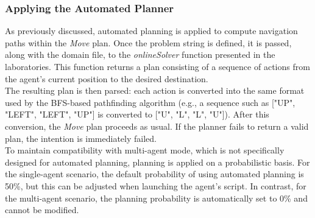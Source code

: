         \subsubsection{Applying the Automated Planner}
            As previously discussed, automated planning is applied to compute navigation paths within the \textit{Move} plan. Once the problem string is defined, it is passed, along with the domain file, to the \textit{onlineSolver} function presented in the laboratories. This function returns a plan consisting of a sequence of actions from the agent's current position to the desired destination.
            \medskip\\
            The resulting plan is then parsed: each action is converted into the same format used by the BFS-based pathfinding algorithm (e.g., a sequence such as ["UP", "LEFT", "LEFT", "UP"] is converted to ["U", "L", "L", "U"]). After this conversion, the \textit{Move} plan proceeds as usual. If the planner fails to return a valid plan, the intention is immediately failed.
            \medskip\\
            To maintain compatibility with multi-agent mode, which is not specifically designed for automated planning, planning is applied on a probabilistic basis. For the single-agent scenario, the default probability of using automated planning is 50\%, but this can be adjusted when launching the agent's script. In contrast, for the multi-agent scenario, the planning probability is automatically set to 0\% and cannot be modified.

